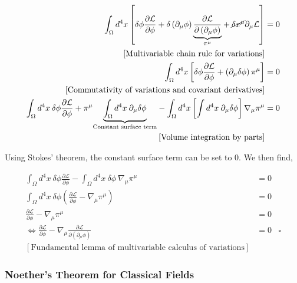\documentclass{beamer}
\begin{document}
\begin{frame}
\begin{align*}
\int_\Omega d^4 x \left[ \delta \phi \frac{\partial \mathcal{L}}{\partial \phi} + \delta \left( \partial_\mu \phi \right) \underset{\pi^\mu}{\underbrace{\frac{\partial \mathcal{L}}{\partial \left( \partial_\mu \phi \right)}}} + \cancel{\delta x^\mu} \partial_\mu \mathcal{L} \right] & = 0 \\
\left[ \text{Multivariable chain rule for variations} \right] \\
\int_\Omega d^4 x \left[ \delta \phi \frac{\partial \mathcal{L}}{\partial \phi} + \left( \partial_\mu \delta \phi \right) \pi^\mu \right] & = 0 \\
\left[ \text{Commutativity of variations and covariant derivatives} \right] \\
\int_\Omega d^4 x \: \delta \phi \frac{\partial \mathcal{L}}{\partial \phi} + \pi^\mu \underset{\text{Constant surface term}}{\underbrace{\int_\Omega d^4 x \: \partial_\mu \delta \phi}} - \int_\Omega d^4 x \left[ \int d^4 x \: \partial_\mu \delta \phi \right] \nabla_\mu \pi^\mu & = 0 \\
\left[ \text{Volume integration by parts} \right] \\
\end{align*}
\end{frame}

\begin{frame}
Using Stokes' theorem, the constant surface term can be set to $0$. We then find,

\begin{align*}
\int_\Omega d^4 x \: \delta \phi \frac{\partial \mathcal{L}}{\partial \phi} - \int_\Omega d^4 x \: \delta \phi \: \nabla_\mu \pi^\mu & = 0 \\
\int_\Omega d^4 x \: \delta \phi \left( \frac{\partial \mathcal{L}}{\partial \phi} - \nabla_\mu \pi^\mu \right) & = 0 \\
\frac{\partial \mathcal{L}}{\partial \phi} - \nabla_\mu \pi^\mu & = 0 \\
\Longleftrightarrow \frac{\partial \mathcal{L}}{\partial \phi} - \nabla_\mu \frac{\partial \mathcal{L}}{\partial \left( \partial_\mu \phi \right)} & = 0 & \square \\
\left[ \text{Fundamental lemma of multivariable calculus of variations} \right]
\end{align*}
\end{frame}

\begin{frame}
\frametitle{Noether's Theorem for Classical Fields}

\end{frame}
\end{document}
